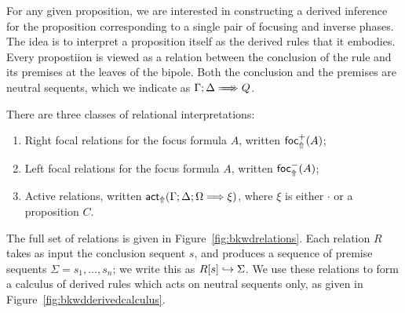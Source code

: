 For any given proposition, we are interested in constructing a derived inference
for the proposition corresponding to a single pair of focusing and inverse
phases. The idea is to interpret a proposition itself as the derived rules that
it embodies. Every propostiion is viewed as a relation between the conclusion of
the rule and its premises at the leaves of the bipole. Both the conclusion and
the premises are neutral sequents, which we indicate as
$\bneuseq{\Gamma}{\Delta}{Q}$.

There are three classes of relational interpretations:

\begin{enumerate}
\item Right focal relations for the focus formula $A$, written $\textsf{foc}^+_{\Uparrow}(A)$;
\item Left focal relations for the focus formula $A$, written $\textsf{foc}^-_{\Uparrow}(A)$;
\item Active relations, written
  $\textsf{act}_{\Uparrow}(\Gamma; \Delta; \Omega \Longrightarrow \xi)$, where $\xi$ is either
  $\cdot$ or a proposition $C$.
\end{enumerate}

The full set of relations is given in Figure~\ref{fig:bkwdrelations}. Each
relation $R$ takes as input the conclusion sequent $s$, and produces a sequence
of premise sequents $\Sigma = s_1, \dots, s_n$; we write this as
$R [s] \hookrightarrow \Sigma$. We use these relations to form a calculus of derived
rules which acts on neutral sequents only, as given in
Figure~\ref{fig:bkwdderivedcalculus}.

